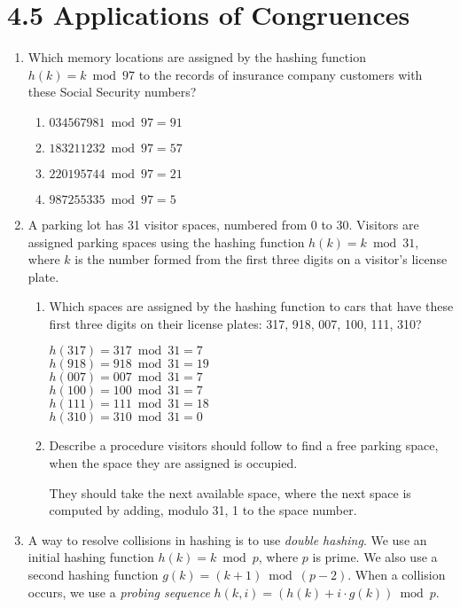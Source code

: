 \documentclass[11pt]{article}
\begin{document}
\section*{\textbf{4.5 Applications of Congruences}}
\begin{enumerate}[label=\textbf{\arabic*.}]
	\item Which memory locations are assigned by the hashing function $h(k) = k \bmod 97$ to the records of insurance company customers with these Social Security numbers?
	
	\begin{enumerate}[label=\textbf{\alph*)}]
		\item $034567981 \bmod 97 = 91$
		\item $183211232 \bmod 97 = 57$
		\item $220195744 \bmod 97 = 21$
		\item $987255335 \bmod 97 = 5$
	\end{enumerate}

	\item A parking lot has 31 visitor spaces, numbered from 0 to 30. Visitors are assigned parking spaces using the hashing function $h(k) = k \bmod 31$, where $k$ is the number formed from the first three digits on a visitor's license plate.
	
	\begin{enumerate}[label=\textbf{\alph*)}]
		\item Which spaces are assigned by the hashing function to cars that have these first three digits on their license plates: 317, 918, 007, 100, 111, 310?
		
		$h(317) = 317 \bmod 31 = 7$ \\
		$h(918) = 918 \bmod 31 = 19$ \\
		$h(007) = 007 \bmod 31 = 7$ \\
		$h(100) = 100 \bmod 31 = 7$ \\
		$h(111) = 111 \bmod 31 = 18$ \\
		$h(310) = 310 \bmod 31 = 0$
		
		\item Describe a procedure visitors should follow to find a free parking space, when the space they are assigned is occupied.
		
		They should take the next available space, where the next space is computed by adding, modulo 31, 1 to the space number.
	\end{enumerate}

	\item A way to resolve collisions in hashing is to use \emph{double hashing}. We use an initial hashing function $h(k) = k \bmod p$, where $p$ is prime. We also use a second hashing function $g(k) = (k + 1) \bmod (p - 2)$. When a collision occurs, we use a \emph{probing sequence} $h(k, i) = (h(k) + i \cdot g(k)) \bmod p$.
	

\end{enumerate}
\end{document}
